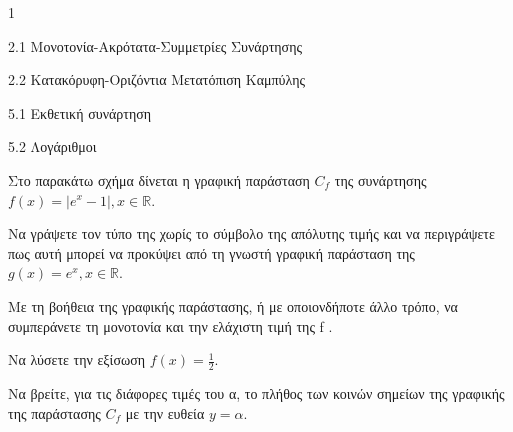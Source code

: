 \begin{ylh}{1}
\item 2.1 Μονοτονία-Ακρότατα-Συμμετρίες Συνάρτησης
\item 2.2 Κατακόρυφη-Οριζόντια Μετατόπιση Καμπύλης
\item 5.1 Εκθετική συνάρτηση
\item 5.2 Λογάριθμοι
\end{ylh}
Στο παρακάτω σχήμα δίνεται η γραφική παράσταση $C_f$ της συνάρτησης $f(x) = |e^x - 1|, x \in \mathbb{R}$.
\begin{center}
\end{center}
\begin{alist}
\item Να γράψετε τον τύπο της χωρίς το σύμβολο της απόλυτης τιμής και να περιγράψετε πως αυτή μπορεί να προκύψει από τη γνωστή γραφική παράσταση της $g(x) = e^x, x \in \mathbb{R}$.
\item Με τη βοήθεια της γραφικής παράστασης, ή με οποιονδήποτε άλλο τρόπο, να συμπεράνετε τη μονοτονία και την ελάχιστη τιμή της f .
\item Να λύσετε την εξίσωση $f(x) = \frac{1}{2}$.
\item Να βρείτε, για τις διάφορες τιμές του α, το πλήθος των κοινών σημείων της γραφικής της παράστασης $C_f$ με την ευθεία $y = \alpha$.
\end{alist}


